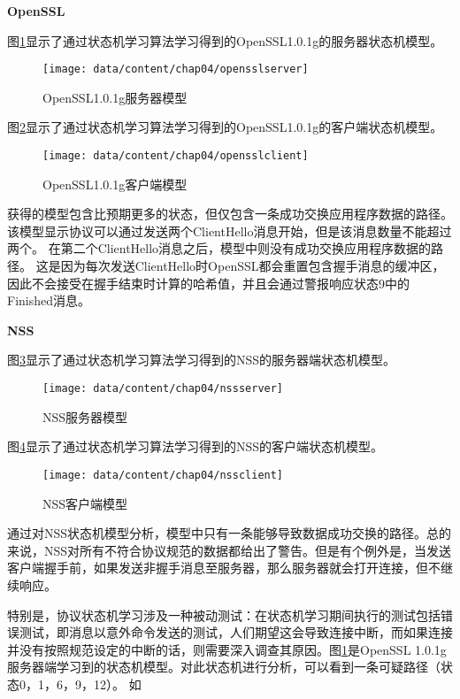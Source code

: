 \textbf{OpenSSL}

图\ref{fig-opensslserver}显示了通过状态机学习算法学习得到的OpenSSL1.0.1g的服务器状态机模型。
\begin{figure}[htp]
	\centering
	\texttt{[image: data/content/chap04/opensslserver]}
	\caption{OpenSSL1.0.1g服务器模型}
	\label{fig-opensslserver}
\end{figure}


图\ref{fig-opensslclient}显示了通过状态机学习算法学习得到的OpenSSL1.0.1g的客户端状态机模型。
\begin{figure}[htp]
	\centering
	\texttt{[image: data/content/chap04/opensslclient]}
	\caption{OpenSSL1.0.1g客户端模型}
	\label{fig-opensslclient}
\end{figure}


获得的模型包含比预期更多的状态，但仅包含一条成功交换应用程序数据的路径。
该模型显示协议可以通过发送两个ClientHello消息开始，但是该消息数量不能超过两个。 在第二个ClientHello消息之后，模型中则没有成功交换应用程序数据的路径。 这是因为每次发送ClientHello时OpenSSL都会重置包含握手消息的缓冲区，因此不会接受在握手结束时计算的哈希值，并且会通过警报响应状态9中的Finished消息。


\textbf{NSS}

图\ref{fig-nssserver}显示了通过状态机学习算法学习得到的NSS的服务器端状态机模型。
\begin{figure}[htp]
	\centering
	\texttt{[image: data/content/chap04/nssserver]}
	\caption{NSS服务器模型}
	\label{fig-nssserver}
\end{figure}


图\ref{fig-nssclient}显示了通过状态机学习算法学习得到的NSS的客户端状态机模型。
\begin{figure}[htp]
	\centering
	\texttt{[image: data/content/chap04/nssclient]}
	\caption{NSS客户端模型}
	\label{fig-nssclient}
\end{figure}

通过对NSS状态机模型分析，模型中只有一条能够导致数据成功交换的路径。总的来说，NSS对所有不符合协议规范的数据都给出了警告。但是有个例外是，当发送客户端握手前，如果发送非握手消息至服务器，那么服务器就会打开连接，但不继续响应。



特别是，协议状态机学习涉及一种被动测试：在状态机学习期间执行的测试包括错误测试，即消息以意外命令发送的测试，人们期望这会导致连接中断，而如果连接并没有按照规范设定的中断的话，则需要深入调查其原因。图\ref{fig-opensslserver}是OpenSSL 1.0.1g服务器端学习到的状态机模型。对此状态机进行分析，可以看到一条可疑路径（状态0，1，6，9，12）。
如

